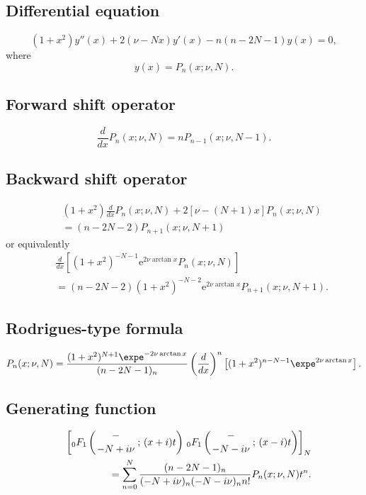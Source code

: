 \documentclass[envcountchap,graybox]{svmono}
\newcommand{\hyp}[5]{\mbox{}_{#1}{F}_{#2}
\left(\genfrac{}{}{0pt}{}{#3}{#4}\,;\,#5\right)}
\newcommand{\e}{\textrm{e}}
\begin{document}
\subsection*{Differential equation}
\begin{equation}
\label{dvPseudoJacobi}
(1+x^2)y''(x)+2\left(\nu-Nx\right)y'(x)-n(n-2N-1)y(x)=0,
\end{equation}
where
$$y(x)=P_n(x;\nu,N).$$

\subsection*{Forward shift operator}
\begin{equation}
\label{shift1PseudoJacobi}
\frac{d}{dx}P_n(x;\nu,N)=nP_{n-1}(x;\nu,N-1).
\end{equation}

\subsection*{Backward shift operator}
\begin{eqnarray}
\label{shift2PseudoJacobiI}
& &(1+x^2)\frac{d}{dx}P_n(x;\nu,N)+2\left[\nu-(N+1)x\right]P_n(x;\nu,N)\nonumber\\
& &{}=(n-2N-2)P_{n+1}(x;\nu,N+1)
\end{eqnarray}
or equivalently
\begin{eqnarray}
\label{shift2PseudoJacobiII}
& &\frac{d}{dx}\left[(1+x^2)^{-N-1}\e^{2\nu\arctan x}P_n(x;\nu,N)\right]\nonumber\\
& &{}=(n-2N-2)(1+x^2)^{-N-2}\e^{2\nu\arctan x}P_{n+1}(x;\nu,N+1).
\end{eqnarray}

\subsection*{Rodrigues-type formula}
\begin{equation}
\label{RodPseudoJacobi}
P_n(x;\nu,N)=\frac{(1+x^2)^{N+1}\expe^{-2\nu\arctan x}}{(n-2N-1)_n}
\left(\frac{d}{dx}\right)^n\left[(1+x^2)^{n-N-1}\expe^{2\nu\arctan x}\right].
\end{equation}

\subsection*{Generating function}
\begin{eqnarray}
\label{GenPseudoJacobi}
& &\left[\hyp{0}{1}{-}{-N+i\nu}{(x+i)t}\,\hyp{0}{1}{-}{-N-i\nu}{(x-i)t}\right]_N\nonumber\\
& &{}=\sum_{n=0}^N\frac{(n-2N-1)_n}{(-N+i\nu)_n(-N-i\nu)_nn!}P_n(x;\nu,N)t^n.
\end{eqnarray}
\end{document}
